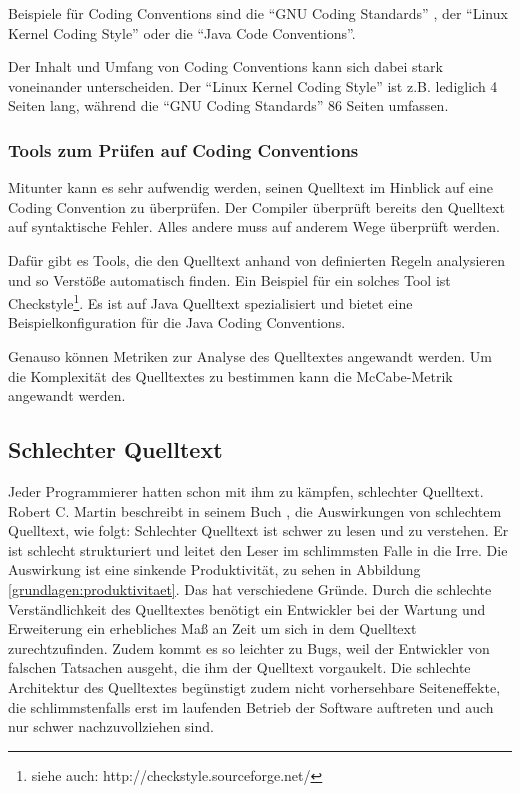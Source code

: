 Beispiele für Coding Conventions sind die \enquote{GNU Coding Standards} \cite{GNUCode},
der \enquote{Linux Kernel Coding Style}\cite{KernelCode} oder die \enquote{Java Code Conventions}\cite{javacode}.

Der Inhalt und Umfang von Coding Conventions kann sich dabei stark voneinander
unterscheiden. Der \enquote{Linux Kernel Coding Style} ist z.B. lediglich 4 Seiten lang,
während die \enquote{GNU Coding Standards} 86 Seiten umfassen.

\subsubsection{Tools zum Prüfen auf Coding Conventions}


Mitunter kann es sehr aufwendig werden, seinen Quelltext im Hinblick auf eine Coding Convention zu überprüfen. Der Compiler überprüft bereits den Quelltext auf  syntaktische Fehler. Alles andere muss auf anderem Wege überprüft werden.

Dafür gibt es Tools, die den Quelltext anhand von definierten Regeln analysieren
und so Verstöße automatisch finden. Ein Beispiel für ein solches Tool ist Checkstyle\footnote{siehe auch: http://checkstyle.sourceforge.net/}.
Es ist auf Java Quelltext spezialisiert und bietet eine Beispielkonfiguration für
die Java Coding Conventions.

Genauso können Metriken zur Analyse des Quelltextes angewandt werden. Um die Komplexität des Quelltextes zu bestimmen kann die McCabe-Metrik\cite{McCabe} angewandt werden.

\subsection{Schlechter Quelltext}

Jeder Programmierer hatten schon mit ihm zu kämpfen, schlechter Quelltext. Robert C. Martin beschreibt in seinem Buch \cite[S. 27f.]{Martin}, die Auswirkungen von schlechtem Quelltext, wie folgt: Schlechter Quelltext ist schwer zu lesen und zu verstehen. Er ist schlecht strukturiert und leitet den Leser im schlimmsten Falle in die Irre.
Die Auswirkung ist eine sinkende Produktivität, zu sehen in Abbildung \ref{grundlagen:produktivitaet}.
Das hat verschiedene Gründe. Durch die schlechte Verständlichkeit des Quelltextes benötigt ein Entwickler bei der Wartung und Erweiterung ein erhebliches Maß an Zeit um sich in dem Quelltext zurechtzufinden. Zudem kommt es so leichter zu Bugs, weil der Entwickler von falschen Tatsachen ausgeht, die ihm der Quelltext vorgaukelt. Die schlechte Architektur des Quelltextes begünstigt zudem nicht vorhersehbare Seiteneffekte, die schlimmstenfalls erst im laufenden Betrieb der Software auftreten und auch nur schwer nachzuvollziehen sind.


